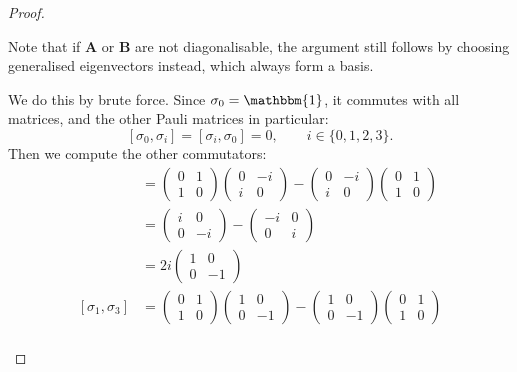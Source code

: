 \begin{proof}
\begin{parts}
		Note that if $\mathbf{A}$ or $\mathbf{B}$ are not diagonalisable, the argument still follows by choosing generalised eigenvectors instead, which always form a basis.
	\item We do this by brute force. Since $\sigma_0=\mathbbm{1}$, it commutes with all matrices, and the other Pauli matrices in particular:
		\[
			[\sigma_0,\sigma_i]=[\sigma_i, \sigma_0]=0,\qquad i\in \{0,1,2,3\} 
		.\] 
		Then we compute the other commutators:
		\begin{align*}
			[\sigma_1,\sigma_2] &= \begin{pmatrix} 0 & 1 \\ 1 & 0 \end{pmatrix} \begin{pmatrix}  0 & -i \\ i & 0 \end{pmatrix} -\begin{pmatrix} 0 & -i \\ i & 0 \end{pmatrix} \begin{pmatrix} 0 & 1 \\ 1 & 0 \end{pmatrix}  \\
					    &= \begin{pmatrix} i & 0 \\ 0 & -i \end{pmatrix} - \begin{pmatrix} -i & 0 \\ 0 & i \end{pmatrix}  \\
					    &= 2 i\begin{pmatrix}1 & 0 \\ 0 & -1  \end{pmatrix}  \\
			[\sigma_1, \sigma_3] &= \begin{pmatrix}  0 & 1 \\ 1 & 0 \end{pmatrix} \begin{pmatrix}  1 & 0 \\ 0 & -1 \end{pmatrix} -\begin{pmatrix} 1 & 0 \\ 0 & -1 \end{pmatrix} \begin{pmatrix}  0 & 1 \\ 1 & 0 \end{pmatrix}  \\

\end{align*}
\end{parts}
\end{proof}
